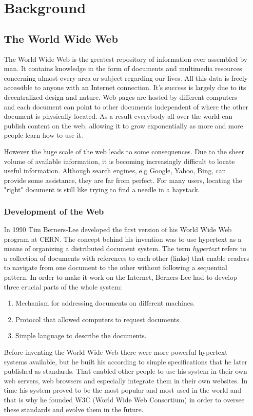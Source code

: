 \chapter{Background}
\label{chap:background}
\section{The World Wide Web}
The World Wide Web is the greatest repository of information ever assembled by
man. It contains knowledge in the form of documents and multimedia resources concerning almost every area or subject regarding our lives. All this data is freely accessible to anyone with an Internet connection. It’s success is largely due to its decentralized design and nature. Web pages are hosted by different computers and each document can point to other documents independent of where the other document is physically located. As a result everybody all over the world can publish content on the web, allowing it to grow exponentially as more and more people learn how to use it.

However the huge scale of the web leads to some consequences. Due to the sheer volume of available information, it is becoming increasingly difficult to locate useful
information. Although search engines, e.g Google, Yahoo, Bing,  can provide some assistance, they are far from perfect. For many users, locating the "right" document is still like trying to find a needle in a haystack.

\subsection{Development of the Web}
In 1990 Tim Berners-Lee developed the first version of his World Wide Web
program at CERN. The concept behind his invention was to use hypertext as a means of organizing a distributed document system. The term \textit{hypertext} refers to a collection of documents with references to each other (links) that enable readers to navigate from one document to the other without following a sequential pattern. In order to make it work on the Internet, Berners-Lee had to develop three crucial parts of the whole system:
\begin{enumerate}
    \item Mechanism for addressing documents on different machines.
    \item Protocol that allowed computers to request documents.
    \item Simple language to describe the documents.
\end{enumerate}
 Before inventing the World Wide Web there were more powerful hypertext systems available, but he built his according to simple specifications that he later published as standards. That enabled other people to use his system in their own web servers, web browsers and especially integrate them in their own websites. In time his system proved to be the most popular and most used in the world and that is why he founded W3C (World Wide Web Consortium) in order to oversee these standards and evolve them in the future.

